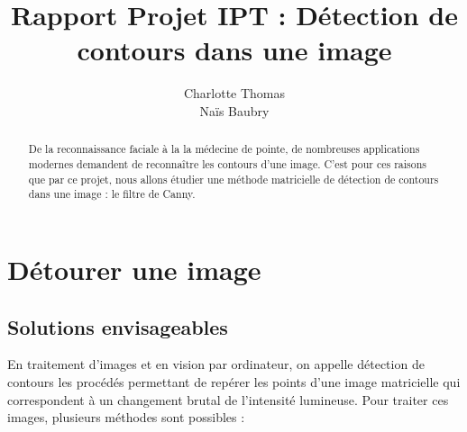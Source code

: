 \documentclass[hidelinks,11pt]{article}
\title{Rapport Projet IPT : Détection de contours dans une image}
\author{Charlotte Thomas \\ Naïs Baubry}
\theoremstyle{mytheoremstyle}
\theoremstyle{mytheoremstyle}
\theoremstyle{myproblemstyle}
\begin{document}
    \maketitle
    \begin{abstract}
        De la reconnaissance faciale à la la médecine de pointe, de nombreuses applications modernes
        demandent de reconnaître les contours d'une image. C'est pour ces raisons que par ce projet,
        nous allons étudier une méthode matricielle de détection de contours dans une image : le filtre
        de Canny.
    \end{abstract}
    \tableofcontents
    \cleardoublepage
    
    \section{Détourer une image}
    \subsection{Solutions envisageables}
    En traitement d'images et en vision par ordinateur, on appelle détection de contours les procédés permettant de repérer
    les points d'une image matricielle qui correspondent à un changement brutal de l'intensité lumineuse. 
    Pour traiter ces images, plusieurs méthodes sont possibles :
    
\end{document}
